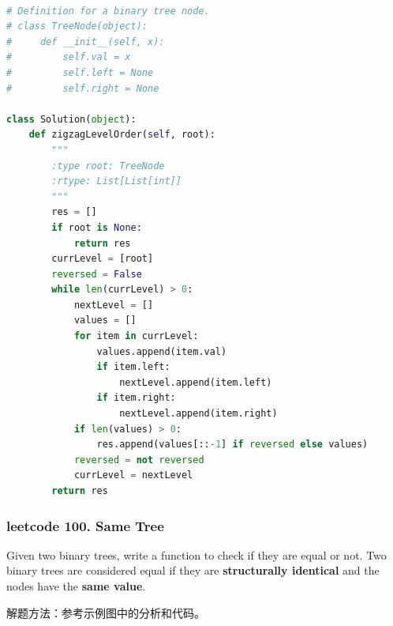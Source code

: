 \documentclass[a4paper,10pt]{article}
\begin{document}
\begin{lstlisting}[language=Python, caption=Problem103. Binary Tree Zigzag Level Order Traversal]

# Definition for a binary tree node.
# class TreeNode(object):
#     def __init__(self, x):
#         self.val = x
#         self.left = None
#         self.right = None

class Solution(object):
    def zigzagLevelOrder(self, root):
        """
        :type root: TreeNode
        :rtype: List[List[int]]
        """
        res = []
        if root is None:
            return res
        currLevel = [root]
        reversed = False
        while len(currLevel) > 0:
            nextLevel = []
            values = []
            for item in currLevel:
                values.append(item.val)
                if item.left:
                    nextLevel.append(item.left)
                if item.right:
                    nextLevel.append(item.right)
            if len(values) > 0:
                res.append(values[::-1] if reversed else values)
            reversed = not reversed
            currLevel = nextLevel
        return res
\end{lstlisting}


\subsubsection{leetcode 100. Same Tree}
Given two binary trees, write a function to check if they are equal or not. Two binary trees are considered equal if they are \textbf{structurally identical} and the nodes have the \textbf{same value}. \\

\begin{CJK*}{UTF8}{gbsn}
\noindent 解题方法：参考示例图中的分析和代码。\\
\end{CJK*}
\end{document}
